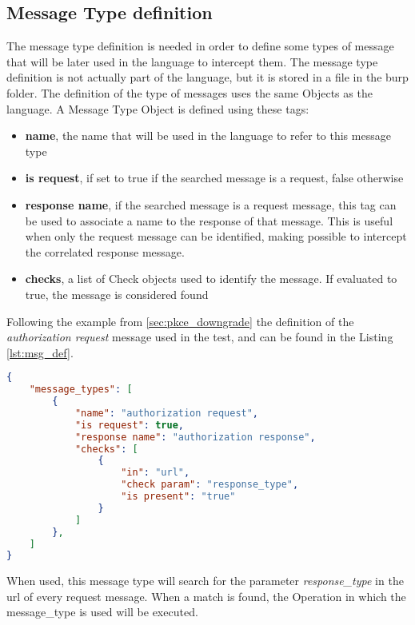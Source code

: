 \subsection{Message Type definition}
The message type definition is needed in order to define some types of message that will be later used in the language to intercept them.
The message type definition is not actually part of the language, but it is stored in a file in the \Gls{burp} folder. The definition of the type of messages uses the same Objects as the language.
A Message Type Object is defined using these tags:
\begin{itemize}
    \item \textbf{name}, the name that will be used in the language to refer to this message type
    \item \textbf{is request}, if set to true if the searched message is a request, false otherwise
    \item \textbf{response name}, if the searched message is a request message, this tag can be used to associate a name to the response of that message. This is useful when only the request message can be identified, making possible to intercept the correlated response message.
    \item \textbf{checks}, a list of Check objects used to identify the message. If evaluated to true, the message is considered found
\end{itemize}

Following the example from \ref{sec:pkce_downgrade} the definition of the \textit{authorization request} message used in the test, and can be found in the Listing \ref{lst:msg_def}.

\begin{lstlisting}[language=json, caption=Message Types definition, label={lst:msg_def}]
{
    "message_types": [
        {
            "name": "authorization request",
            "is request": true,
            "response name": "authorization response",
            "checks": [
                {
                    "in": "url",
                    "check param": "response_type",
                    "is present": "true"
                }
            ]
        },
    ]
}
\end{lstlisting}

When used, this message type will search for the parameter \textit{response\_type} in the url of every request message. When a match is found, the Operation in which the message\_type is used will be executed.

